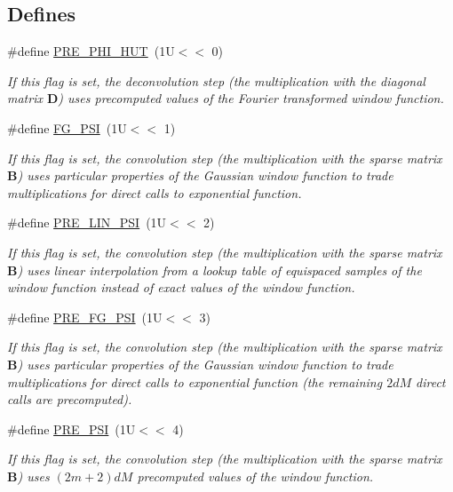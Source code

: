 \subsection*{Defines}
\begin{CompactItemize}
\item 
\#define \hyperlink{group__nfft_ga16}{PRE\_\-PHI\_\-HUT}~(1U$<$$<$ 0)
\begin{CompactList}\small\item\em If this flag is set, the deconvolution step (the multiplication with the diagonal matrix $\mathbf{D}$) uses precomputed values of the Fourier transformed window function. \item\end{CompactList}\item 
\#define \hyperlink{group__nfft_ga17}{FG\_\-PSI}~(1U$<$$<$ 1)
\begin{CompactList}\small\item\em If this flag is set, the convolution step (the multiplication with the sparse matrix $\mathbf{B}$) uses particular properties of the Gaussian window function to trade multiplications for direct calls to exponential function. \item\end{CompactList}\item 
\#define \hyperlink{group__nfft_ga18}{PRE\_\-LIN\_\-PSI}~(1U$<$$<$ 2)
\begin{CompactList}\small\item\em If this flag is set, the convolution step (the multiplication with the sparse matrix $\mathbf{B}$) uses linear interpolation from a lookup table of equispaced samples of the window function instead of exact values of the window function. \item\end{CompactList}\item 
\#define \hyperlink{group__nfft_ga19}{PRE\_\-FG\_\-PSI}~(1U$<$$<$ 3)
\begin{CompactList}\small\item\em If this flag is set, the convolution step (the multiplication with the sparse matrix $\mathbf{B}$) uses particular properties of the Gaussian window function to trade multiplications for direct calls to exponential function (the remaining $2dM$ direct calls are precomputed). \item\end{CompactList}\item 
\#define \hyperlink{group__nfft_ga20}{PRE\_\-PSI}~(1U$<$$<$ 4)
\begin{CompactList}\small\item\em If this flag is set, the convolution step (the multiplication with the sparse matrix $\mathbf{B}$) uses $(2m+2)dM$ precomputed values of the window function. \item\end{CompactList}\item 
$$
\end{CompactItemize}
